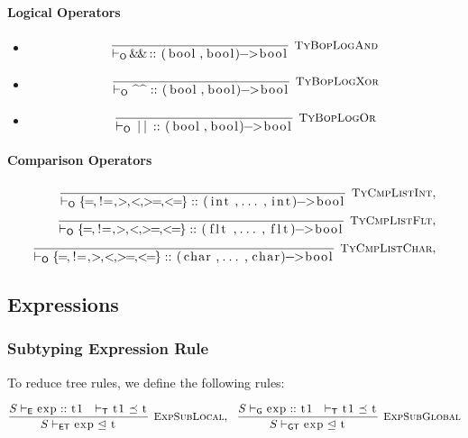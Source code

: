 \documentclass{article}
\newcommand{\code}[1]{\lstinline[columns=fixed]{#1}}
\newcommand{\drmrule}[5]{\frac{#1}{#2\vdash_{\mathsf{#3}}#4}\textsc{\ \small{#5}}}
\newcommand{\ruleapp}[1]{\vdash_{\mathsf{#1}}}
\newcommand{\mc}[1]{\textnormal{\code{#1}}}
\newcommand{\subsubsubsection}{\paragraph}
\begin{document}
				\subsubsubsection{Logical Operators}
				
					\begin{itemize}
						\item 
							\begin{align*}
								\drmrule{}{}{O}{\mc{\&\&} :: \mc{(bool,bool)->bool}}{TyBopLogAnd}
							\end{align*}
						\item 
							\begin{align*}
								\drmrule{}{}{O}{\mc{\^\^} :: \mc{(bool,bool)->bool}}{TyBopLogXor}
							\end{align*}
						\item 
							\begin{align*}
								\drmrule{}{}{O}{\mc{||} :: \mc{(bool,bool)->bool}}{TyBopLogOr}
							\end{align*}
					\end{itemize}
				
				\subsubsubsection{Comparison Operators}
				
					\begin{align*}
						\drmrule{}{}{O}{\{\mc{=},\mc{!=},\mc{>},\mc{<},\mc{>=},\mc{<=}\} :: \mc{(int,...,int)->bool}}{TyCmpListInt},\\
						\drmrule{}{}{O}{\{\mc{=},\mc{!=},\mc{>},\mc{<},\mc{>=},\mc{<=}\} :: \mc{(flt,...,flt)->bool}}{TyCmpListFlt},\\
						\drmrule{}{}{O}{\{\mc{=},\mc{!=},\mc{>},\mc{<},\mc{>=},\mc{<=}\} :: \mc{(char,...,char)->bool}}{TyCmpListChar},\\
					\end{align*}
					
					
		\subsection{Expressions}
		
			\subsubsection{Subtyping Expression Rule}
			
				To reduce tree rules, we define the following rules:
				
				\begin{align*}
					\drmrule{S\ruleapp{E}\mc{exp}::\mc{t1}\ \ \ruleapp{T}\mc{t1}\preceq\mc{t}}{S}{ET}{\mc{exp} \trianglelefteq \mc{t}}{ExpSubLocal},\ \ 
					\drmrule{S\ruleapp{G}\mc{exp}::\mc{t1}\ \ \ruleapp{T}\mc{t1}\preceq\mc{t}}{S}{GT}{\mc{exp} \trianglelefteq \mc{t}}{ExpSubGlobal}
				\end{align*}
		
\end{document}
